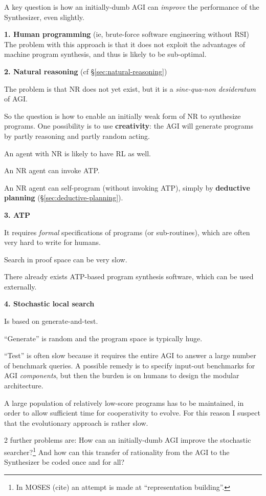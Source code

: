 A key question is how an initially-dumb AGI can \textit{improve} the performance of the Synthesizer, even slightly.

\textbf{1. Human programming} (ie, brute-force software engineering without RSI)\\ 
The problem with this approach is that it does not exploit the advantages of machine program synthesis, and thus is likely to be sub-optimal.

\textbf{2. Natural reasoning} (cf \S\ref{sec:natural-reasoning})
\begin{compactenum-}[(a)]
\item  The problem is that NR does not yet exist, but it is a \textit{sine-qua-non desideratum} of AGI.
\item  So the question is how to enable an initially weak form of NR to synthesize programs.  One possibility is to use \textbf{creativity}:  the AGI will generate programs by partly reasoning and partly random acting.
\item  An agent with NR is likely to have RL as well.
\item  An NR agent can invoke ATP.
\item  An NR agent can self-program (without invoking ATP), simply by \textbf{deductive planning} (\S\ref{sec:deductive-planning}).
\end{compactenum-}

\textbf{3. ATP} 
\begin{compactenum-}[(a)]
\item  It requires \textit{formal} specifications of programs (or sub-routines), which are often very hard to write for humans.
\item  Search in proof space can be very slow.
\item  There already exists ATP-based program synthesis software, which can be used externally.
\end{compactenum-}

\textbf{4. Stochastic local search} 
\begin{compactenum-}[(a)]
\item  Is based on generate-and-test.
\item  ``Generate'' is random and the program space is typically huge.
\item  ``Test'' is often slow because it requires the entire AGI to answer a large number of benchmark queries.  A possible remedy is to specify input-out benchmarks for AGI \textit{components}, but then the burden is on humans to design the modular architecture.
\item  A large population of relatively low-score programs has to be maintained, in order to allow sufficient time for cooperativity to evolve.  For this reason I suspect that the evolutionary approach is rather slow.
\item  2 further problems are:  How can an initially-dumb AGI improve the stochastic searcher?\footnote{In MOSES (cite) an attempt is made at ``representation building''.} And how can this transfer of rationality from the AGI to the Synthesizer be coded once and for all?
\end{compactenum-}

